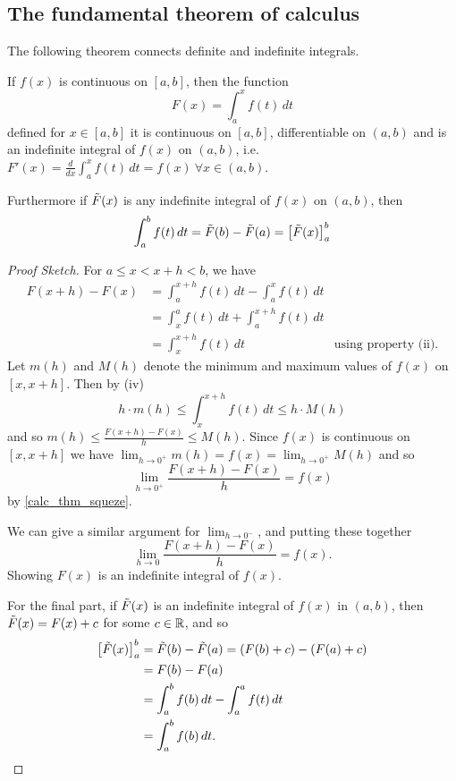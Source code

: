 \documentclass[10pt, a4paper]{article}
\begin{document}
\subsection{The fundamental theorem of calculus}
The following theorem connects definite and indefinite integrals.
\begin{theorem}
    If $f(x)$ is continuous on $[a, b]$,
    then the function
    \[
    F(x) = \int_a^xf(t)\,dt
    \]
    defined for $x \in [a, b]$ it is continuous on $[a, b]$,
    differentiable on $(a, b)$ and is an indefinite integral of $f(x)$ on $(a, b)$,
    i.e. $F'(x) = \frac{d}{dx}\int_a^xf(t)\,dt = f(x)\ \forall x \in (a, b)$.

    Furthermore if $\Tilde{F}(x)$ is any indefinite integral of $f(x)$ on $(a, b)$,
    then
    \[
    \int_a^bf(t)\,dt = \Tilde{F}(b) - \Tilde{F}(a) = \left[\Tilde{F}(x)\right]^b_a
    \]
    \begin{proof}[Proof Sketch]\renewcommand{\qedsymbol}{$\triangle$}
        For $a \leq x < x + h < b$,
        we have
        \begin{align*}
            F(x + h) - F(x) &= \int_a^{x + h}f(t)\,dt - \int_a^xf(t)\,dt \\
            &= \int_x^af(t)\,dt + \int_a^{x + h}f(t)\,dt \\
            &= \int_x^{x + h}f(t)\,dt&\text{using property (ii)}.
        \end{align*}
        Let $m(h)$ and $M(h)$ denote the minimum and maximum values of $f(x)$ on $[x, x + h]$.
        Then by (iv)
        \[
        h \cdot m(h) \leq \int_x^{x + h}f(t)\,dt \leq h \cdot M(h)
        \]
        and so $m(h) \leq \frac{F(x + h) - F(x)}{h} \leq M(h)$.
        Since $f(x)$ is continuous on $[x, x + h]$ we have $\displaystyle\lim_{h \rightarrow 0 ^ +}m(h) = f(x) = \lim_{h \rightarrow 0 ^ +}M(h)$
        and so
        \[
        \lim_{h \rightarrow 0 ^ +}\frac{F(x + h) - F(x)}{h} = f(x)
        \]
        by \autoref{calc_thm_squeze}.

        We can give a similar argument for $\lim_{h \rightarrow 0 ^ -}$,
        and putting these together
        \[
        \lim_{h \rightarrow 0}\frac{F(x + h) - F(x)}{h} = f(x).
        \]
        Showing $F(x)$ is an indefinite integral of $f(x)$.

        For the final part,
        if $\Tilde{F}(x)$ is an indefinite integral of $f(x)$ in $(a, b)$,
        then $\Tilde{F}(x) = F(x) + c$ for some $c \in \mathbb{R}$,
        and so
        \begin{align*}
        \left[\Tilde{F}(x)\right]_a^b &= \Tilde{F}(b) - \Tilde{F}(a) = (F(b) + c) - (F(a) + c) \\
        &= F(b) - F(a) \\
        &= \int_a^bf(b)\,dt - \int_a^af(t)\,dt \\
        &= \int_a^bf(b)\,dt.
        \end{align*}
    \end{proof}
\end{theorem}
\end{document}
